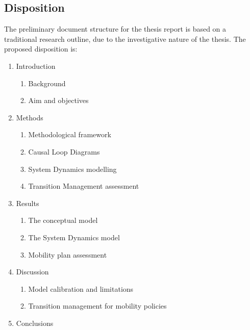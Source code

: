 \documentclass[a4paper,fontsize=10pt,bibliography=totoc]{scrartcl}
\newenvironment{dispositionlist}{%
	\begingroup
	\small
	\begin{enumerate}[label*=\arabic*.]
}{ %
	\end{enumerate}
	\endgroup
}
\begin{document}
\begin{multicols}{2}
\section{Disposition}
The preliminary document structure for the thesis report is based on a traditional research outline, due to the investigative nature of the thesis. The proposed disposition is:

\begin{dispositionlist}
	\item Introduction
		\begin{dispositionlist}
			\item Background
			\item Aim and objectives
		\end{dispositionlist}
	\item Methods
		\begin{dispositionlist}
			\item Methodological framework
			\item Causal Loop Diagrams
			\item System Dynamics modelling
			\item Transition Management assessment
		\end{dispositionlist}
	\item Results
		\begin{dispositionlist}
			\item The conceptual model
			\item The System Dynamics model
			\item Mobility plan assessment
		\end{dispositionlist}
	\item Discussion
		\begin{dispositionlist}
			\item Model calibration and limitations
			\item Transition management for mobility policies
		\end{dispositionlist}
	\item Conclusions
\end{dispositionlist}


\end{multicols}
\end{document}
